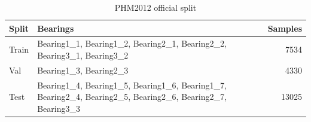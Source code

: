 \begin{table}[htbp]
\centering
\caption{PHM2012 official split}
\label{tab:phm2012_split_summary}
\scriptsize
\begin{tabularx}{\textwidth}{lYr}
\toprule
Split & Bearings & Samples \\
\midrule
Train & Bearing1\_1, Bearing1\_2, Bearing2\_1, Bearing2\_2, Bearing3\_1, Bearing3\_2 & 7534 \\
Val & Bearing1\_3, Bearing2\_3 & 4330 \\
Test & Bearing1\_4, Bearing1\_5, Bearing1\_6, Bearing1\_7, Bearing2\_4, Bearing2\_5, Bearing2\_6, Bearing2\_7, Bearing3\_3 & 13025 \\
\bottomrule
\end{tabularx}
\end{table}
